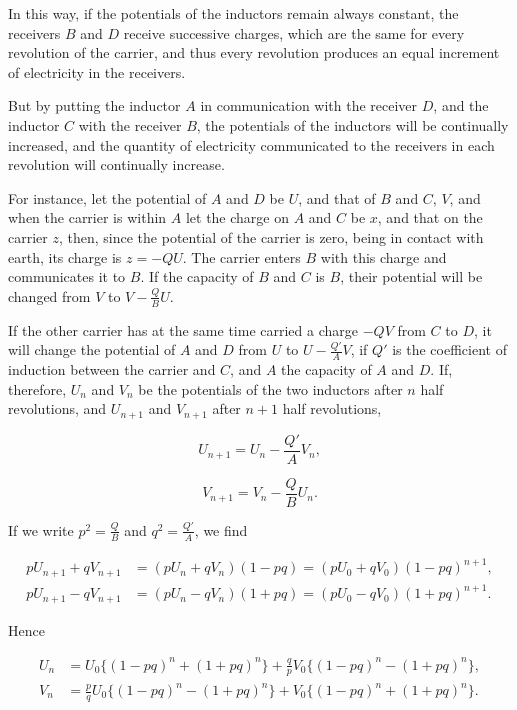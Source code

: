 \documentclass[11pt,a4paper]{article}
\begin{document}
In this way, if the potentials of the inductors remain always constant,
the receivers $B$ and $D$ receive successive charges, which are the same
for every revolution of the carrier, and thus every revolution produces
an equal increment of electricity in the receivers.

\clearpage

But by putting the inductor $A$ in communication with the receiver $D$,
and the inductor $C$ with the receiver $B$, the potentials of the
inductors will be continually increased, and the quantity of electricity
communicated to the receivers in each revolution will continually
increase.

For instance, let the potential of $A$ and $D$ be $U$, and that of $B$
and $C$, $V$, and when the carrier is within $A$ let the charge on $A$
and $C$ be $x$, and that on the carrier $z$, then, since the potential
of the carrier is zero, being in contact with earth, its charge is
$z=-QU$. The carrier enters $B$ with this charge and communicates it to
$B$. If the capacity of $B$ and $C$ is $B$, their potential will be
changed from $V$ to $V-\frac{Q}{B}U$.

If the other carrier has at the same time carried a charge $-QV$ from
$C$ to $D$, it will change the potential of $A$ and $D$ from $U$ to
$U-\frac{Q'}{A}V$, if $Q'$ is the coefficient of induction between the
carrier and $C$, and $A$ the capacity of $A$ and $D$. If, therefore,
$U_n$ and $V_n$ be the potentials of the two inductors after $n$ half
revolutions, and $U_{n+1}$ and $V_{n+1}$ after $n+1$ half revolutions,

\[
U_{n+1}=U_n-\frac{Q'}{A}V_n,
\]
  
\[
V_{n+1}=V_n-\frac{Q}{B}U_n.
\]

If we write $p^2=\frac{Q}{B}$ and $q^2=\frac{Q'}{A}$, we find

\[
\begin{split}
pU_{n+1}+qV_{n+1}
&=(pU_n+qV_n)(1-pq)=(pU_0+qV_0)(1-pq)^{n+1},\\
pU_{n+1}-qV_{n+1}
&=(pU_n-qV_n)(1+pq)=(pU_0-qV_0)(1+pq)^{n+1}.
\end{split}
\]

Hence

\[
\begin{split}
U_n&=U_0\{(1-pq)^n+(1+pq)^n\}
+\frac{q}{p}V_0\{(1-pq)^n-(1+pq)^n\},\\
V_n&=\frac{p}{q}U_0\{(1-pq)^n-(1+pq)^n\}
+V_0\{(1-pq)^n+(1+pq)^n\}.
\end{split}
\]
\end{document}
